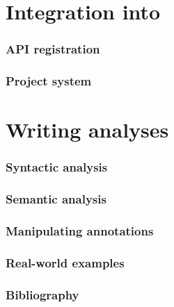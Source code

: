 \documentclass[pdf,utf8,xcolor=x11names]{beamer}
\begin{document}

\part{Integration into \protect\framac}

\section{API registration}


\section{Project system}



\part{Writing analyses}

\section{Syntactic analysis}
\section{Semantic analysis}
\section{Manipulating annotations}


\section{Real-world examples}

\section{Bibliography}

\end{document}

